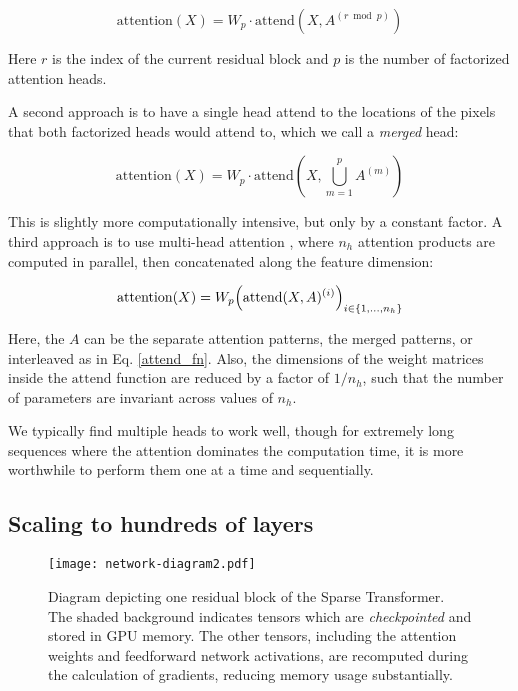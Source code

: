 \documentclass{article}
\begin{document}
\begin{equation}\label{sepwpmat}
\mathrm{attention}(X) = W_p \cdot \mathrm{attend}(X, A^{(r \bmod p)})\end{equation}

Here $r$ is the index of the current residual block and $p$ is the number of factorized attention heads.

A second approach is to have a single head attend to the locations of the pixels that both factorized heads would attend to, which we call a \textit{merged} head:

\begin{equation}\label{mergedmat}
\mathrm{attention}(X) = W_p \cdot \mathrm{attend}(X, \bigcup_{m=1}^{p} A^{(m)})\end{equation}

This is slightly more computationally intensive, but only by a constant factor. A third approach is to use multi-head attention \cite{vaswani2017attention}, where $n_{h}$ attention products are computed in parallel, then concatenated along the feature dimension:

\begin{equation}
\mathrm{attention}(X) = W_p \Bigl( \mathrm{attend}(X, A)^{(i)} \Bigr)_{i \in \{1, ..., n_{h}\}}
\end{equation}

Here, the $A$ can be the separate attention patterns, the merged patterns, or interleaved as in Eq. \ref{attend_fn}. Also, the dimensions of the weight matrices inside the $\mathrm{attend}$ function are reduced by a factor of $1/n_{h}$, such that the number of parameters are invariant across values of $n_{h}$.

We typically find multiple heads to work well, though for extremely long sequences where the attention dominates the computation time, it is more worthwhile to perform them one at a time and sequentially.

\subsection{Scaling to hundreds of layers}

\begin{figure}[t]
\centering
\setlength\fboxsep{0pt}
\setlength\fboxrule{0.25pt}
\texttt{[image: network-diagram2.pdf]}
\caption{Diagram depicting one residual block of the Sparse Transformer. The shaded background indicates tensors which are \textit{checkpointed} \cite{chen2016training} and stored in GPU memory. The other tensors, including the attention weights and feedforward network activations, are recomputed during the calculation of gradients, reducing memory usage substantially. }
\label{gemnetarch}
\end{figure}
\end{document}
